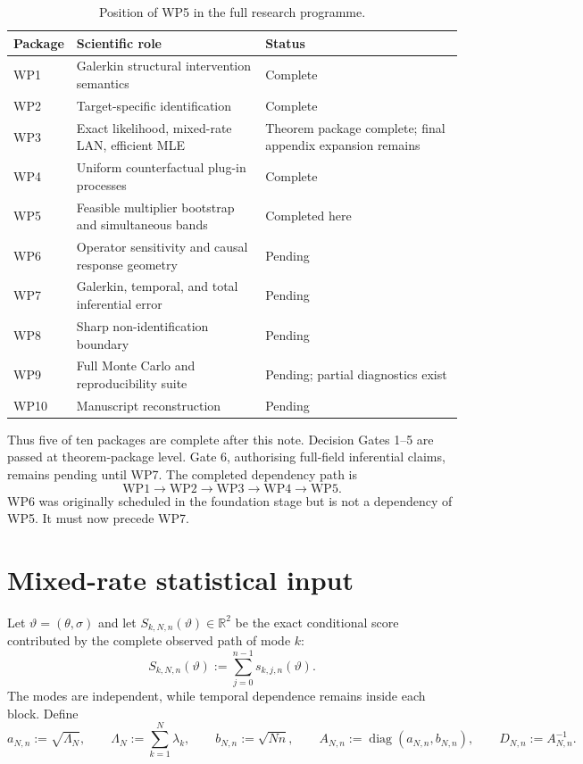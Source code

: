 \documentclass[11pt]{article}
\theoremstyle{remark}
\newcommand{\R}{\mathbb R}
\newcommand{\diag}{\operatorname{diag}}
\newcommand{\an}{a_{N,n}}
\newcommand{\bn}{b_{N,n}}
\newcommand{\LamN}{\Lambda_N}
\newcommand{\Dmat}{D_{N,n}}
\newcommand{\Amat}{A_{N,n}}
\begin{document}
\begin{table}[ht]
\centering
\small
\begin{tabularx}{\textwidth}{@{}lXl@{}}
\toprule
Package & Scientific role & Status\\
\midrule
WP1 & Galerkin structural intervention semantics & Complete\\
WP2 & Target-specific identification & Complete\\
WP3 & Exact likelihood, mixed-rate LAN, efficient MLE & Theorem package complete; final appendix expansion remains\\
WP4 & Uniform counterfactual plug-in processes & Complete\\
WP5 & Feasible multiplier bootstrap and simultaneous bands & Completed here\\
WP6 & Operator sensitivity and causal response geometry & Pending\\
WP7 & Galerkin, temporal, and total inferential error & Pending\\
WP8 & Sharp non-identification boundary & Pending\\
WP9 & Full Monte Carlo and reproducibility suite & Pending; partial diagnostics exist\\
WP10 & Manuscript reconstruction & Pending\\
\bottomrule
\end{tabularx}
\caption{Position of WP5 in the full research programme.}
\label{tab:programme}
\end{table}

Thus five of ten packages are complete after this note. Decision Gates 1--5 are passed at theorem-package level. Gate 6, authorising full-field inferential claims, remains pending until WP7. The completed dependency path is
\[
 \mathrm{WP1}\to\mathrm{WP2}\to\mathrm{WP3}\to\mathrm{WP4}\to\mathrm{WP5}.
\]
WP6 was originally scheduled in the foundation stage but is not a dependency of WP5. It must now precede WP7.

\section{Mixed-rate statistical input}

Let $\vartheta=(\theta,\sigma)$ and let $S_{k,N,n}(\vartheta)\in\R^2$ be the exact conditional score contributed by the complete observed path of mode $k$:
\begin{equation}\label{eq:mode-score}
 S_{k,N,n}(\vartheta)
 :=
 \sum_{j=0}^{n-1}s_{k,j,n}(\vartheta).
\end{equation}
The modes are independent, while temporal dependence remains inside each block. Define
\begin{equation}\label{eq:scales}
 \an:=\sqrt{\LamN},
 \qquad
 \LamN:=\sum_{k=1}^N\lambda_k,
 \qquad
 \bn:=\sqrt{Nn},
 \qquad
 \Amat:=\diag(\an,\bn),
 \qquad
 \Dmat:=\Amat^{-1}.
\end{equation}
\end{document}

